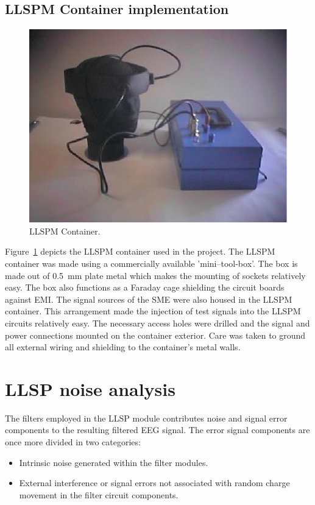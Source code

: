 \subsection{LLSPM Container implementation}
\begin{figure}[htbp]
\begin{center}
	\includegraphics*{whole-system1.ps}
	\caption{LLSPM Container.}
\label{fig:llsp-container}
\end{center}
\end{figure}

Figure~\ref{fig:llsp-container} depicts the LLSPM container used in
the project. The LLSPM container was made using a commercially
available 'mini--tool-box'. The box is made out of 0.5~mm plate metal
which makes the mounting of sockets relatively easy. The box also
functions as a Faraday cage shielding the circuit boards against
EMI. The signal sources of the SME were also housed in the LLSPM
container. This arrangement made the injection of test signals into
the LLSPM circuits relatively easy. The necessary access holes were
drilled and the signal and power connections mounted on the container
exterior. Care was taken to ground all external wiring and shielding
to the container's metal walls.



\section{LLSP noise analysis}
The filters employed in the LLSP module contributes noise and signal
error components to the resulting filtered EEG signal. The error
signal components are once more divided in two categories:
\begin{itemize}
	\item Intrinsic noise generated within the filter modules.
	\item External interference or signal errors not associated with
	random charge movement in the filter circuit components.
\end{itemize} 


